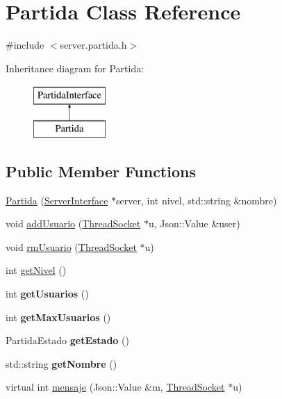 \hypertarget{classPartida}{\section{Partida Class Reference}
\label{classPartida}
}


{\ttfamily \#include $<$server.\-partida.\-h$>$}

Inheritance diagram for Partida\-:\begin{figure}[H]
\begin{center}
\leavevmode
\includegraphics[height=2.000000cm]{classPartida}
\end{center}
\end{figure}
\subsection*{Public Member Functions}
\begin{DoxyCompactItemize}
\item 
\hyperlink{classPartida_a1f7ba9752005060a408c563d8c906767}{Partida} (\hyperlink{classServerInterface}{Server\-Interface} $\ast$server, int nivel, std\-::string \&nombre)
\item 
void \hyperlink{classPartida_a9a6ada8180923f577dbcac9954ef4ac4}{add\-Usuario} (\hyperlink{classThreadSocket}{Thread\-Socket} $\ast$u, Json\-::\-Value \&user)
\item 
void \hyperlink{classPartida_a1676a8787a71098ed0bf65bb27782ceb}{rm\-Usuario} (\hyperlink{classThreadSocket}{Thread\-Socket} $\ast$u)
\item 
int \hyperlink{classPartida_af4035771592061632b5d16879d858cdc}{get\-Nivel} ()
\item 
\hypertarget{classPartida_a8a8fdd55c05f1040dda9fd6df76bfeb2}{int {\bfseries get\-Usuarios} ()}\label{classPartida_a8a8fdd55c05f1040dda9fd6df76bfeb2}

\item 
\hypertarget{classPartida_a32af6c611e9e4556f63633a32c7eb677}{int {\bfseries get\-Max\-Usuarios} ()}\label{classPartida_a32af6c611e9e4556f63633a32c7eb677}

\item 
\hypertarget{classPartida_a74e4a34c63247eb4764a744e54678b8e}{Partida\-Estado {\bfseries get\-Estado} ()}\label{classPartida_a74e4a34c63247eb4764a744e54678b8e}

\item 
\hypertarget{classPartida_a797de83b25e6ff8ebd149f414e9509c7}{std\-::string {\bfseries get\-Nombre} ()}\label{classPartida_a797de83b25e6ff8ebd149f414e9509c7}

\item 
virtual int \hyperlink{classPartida_af5f9e1261116d75042a87ad0b5990700}{mensaje} (Json\-::\-Value \&m, \hyperlink{classThreadSocket}{Thread\-Socket} $\ast$u)
\end{DoxyCompactItemize}
